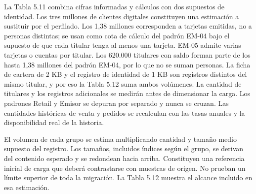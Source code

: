 \documentclass[11pt]{article}
\begin{document}
La Tabla 5.11 combina cifras informadas y cálculos con dos supuestos de identidad. Los tres millones de clientes digitales constituyen una estimación a sustituir por el perfilado. Los 1,38 millones corresponden a tarjetas emitidas, no a personas distintas; se usan como cota de cálculo del padrón EM-04 bajo el supuesto de que cada titular tenga al menos una tarjeta. EM-05 admite varias tarjetas o cuentas por titular. Los 620.000 titulares con saldo forman parte de los hasta 1,38 millones del padrón EM-04, por lo que no se suman personas. La ficha de cartera de 2 KB y el registro de identidad de 1 KB son registros distintos del mismo titular, y por eso la Tabla 5.12 suma ambos volúmenes. La cantidad de titulares y los registros adicionales se medirán antes de dimensionar la carga. Los padrones Retail y Emisor se depuran por separado y nunca se cruzan. Las cantidades históricas de venta y pedidos se recalculan con las tasas anuales y la disponibilidad real de la historia.

El volumen de cada grupo se estima multiplicando cantidad y tamaño medio supuesto del registro. Los tamaños, incluidos índices según el grupo, se derivan del contenido esperado y se redondean hacia arriba. Constituyen una referencia inicial de carga que deberá contrastarse con muestras de origen. No prueban un límite superior de toda la migración. La Tabla 5.12 muestra el alcance incluido en esa estimación.

\par\vspace{0pt plus 48\baselineskip}\vspace{0pt plus -48\baselineskip}
\end{document}
